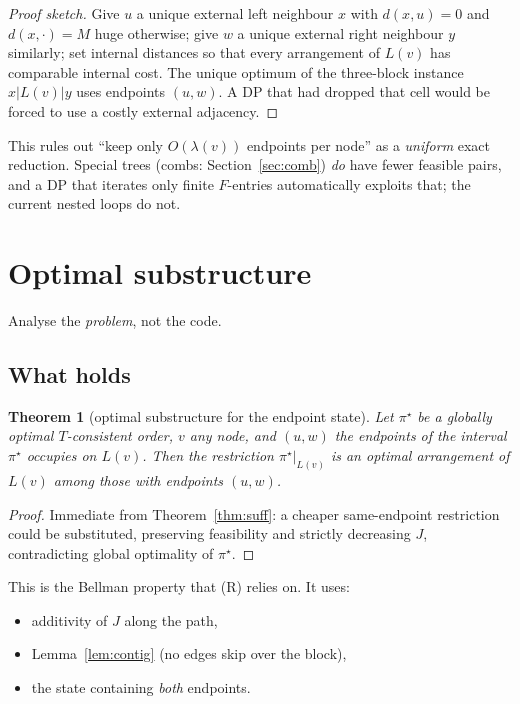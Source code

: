 \documentclass[11pt]{article}
\theoremstyle{plain}
\newtheorem{theorem}{Theorem}[section]
\begin{document}
\begin{proof}[Proof sketch]
Give \(u\) a unique external left neighbour \(x\) with \(d(x,u) = 0\) and
\(d(x,\cdot) = M\) huge otherwise; give \(w\) a unique external right neighbour
\(y\) similarly; set internal distances so that every arrangement of \(L(v)\)
has comparable internal cost. The unique optimum of the three-block instance
\(x \vert L(v) \vert y\) uses endpoints \((u,w)\). A DP that had dropped that
cell would be forced to use a costly external adjacency.
\end{proof}

This rules out ``keep only \(O(\lambda(v))\) endpoints per node'' as a
\emph{uniform} exact reduction. Special trees (combs: Section~\ref{sec:comb})
\emph{do} have fewer feasible pairs, and a DP that iterates only finite
\(F\)-entries automatically exploits that; the current nested loops do not.


\section{Optimal substructure}
\label{sec:substructure}

Analyse the \emph{problem}, not the code.

\subsection{What holds}

\begin{theorem}[optimal substructure for the endpoint state]\label{thm:optend}
Let \(\pi^\star\) be a globally optimal \(T\)-consistent order, \(v\) any node,
and \((u,w)\) the endpoints of the interval \(\pi^\star\) occupies on \(L(v)\).
Then the restriction \(\pi^\star|_{L(v)}\) is an optimal arrangement of \(L(v)\)
among those with endpoints \((u,w)\).
\end{theorem}

\begin{proof}
Immediate from Theorem~\ref{thm:suff}: a cheaper same-endpoint restriction
could be substituted, preserving feasibility and strictly decreasing \(J\),
contradicting global optimality of \(\pi^\star\).
\end{proof}

This is the Bellman property that (R) relies on. It uses:

\begin{itemize}
\item additivity of \(J\) along the path,
\item Lemma~\ref{lem:contig} (no edges skip over the block),
\item the state containing \emph{both} endpoints.
\end{itemize}
\end{document}
